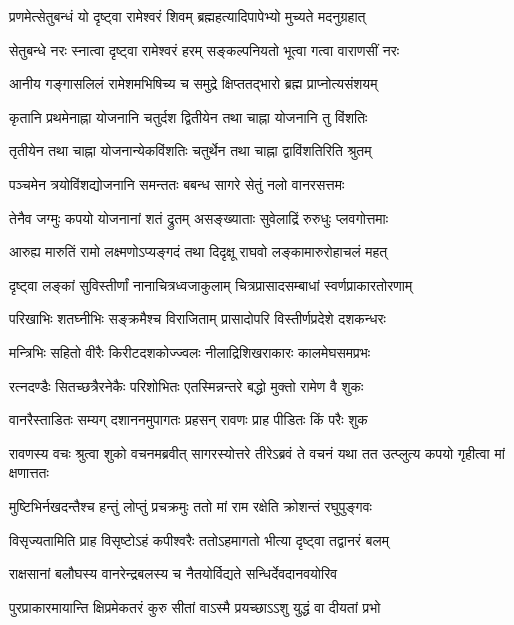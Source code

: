 \twolineshloka
{प्रणमेत्सेतुबन्धं यो दृष्ट्वा रामेश्वरं शिवम्}
{ब्रह्महत्यादिपापेभ्यो मुच्यते मदनुग्रहात्} %

\twolineshloka
{सेतुबन्धे नरः स्नात्वा दृष्ट्वा रामेश्वरं हरम्}
{सङ्कल्पनियतो भूत्वा गत्वा वाराणसीं नरः} %

\twolineshloka
{आनीय गङ्गासलिलं रामेशमभिषिच्य च}
{समुद्रे क्षिप्ततद्भारो ब्रह्म प्राप्नोत्यसंशयम्} %

\twolineshloka
{कृतानि प्रथमेनाह्ना योजनानि चतुर्दश}
{द्वितीयेन तथा चाह्ना योजनानि तु विंशतिः} %

\twolineshloka
{तृतीयेन तथा चाह्ना योजनान्येकविंशतिः}
{चतुर्थेन तथा चाह्ना द्वाविंशतिरिति श्रुतम्} %

\twolineshloka
{पञ्चमेन त्रयोविंशद्योजनानि समन्ततः}
{बबन्ध सागरे सेतुं नलो वानरसत्तमः} %

\twolineshloka
{तेनैव जग्मुः कपयो योजनानां शतं द्रुतम्}
{असङ्ख्याताः सुवेलाद्रिं रुरुधुः प्लवगोत्तमाः} %

\twolineshloka
{आरुह्य मारुतिं रामो लक्ष्मणोऽप्यङ्गदं तथा}
{दिदृक्षू राघवो लङ्कामारुरोहाचलं महत्} %

\twolineshloka
{दृष्ट्वा लङ्कां सुविस्तीर्णां नानाचित्रध्वजाकुलाम्}
{चित्रप्रासादसम्बाधां स्वर्णप्राकारतोरणाम्} %

\twolineshloka
{परिखाभिः शतघ्नीभिः सङ्क्रमैश्च विराजिताम्}
{प्रासादोपरि विस्तीर्णप्रदेशे दशकन्धरः} %

\twolineshloka
{मन्त्रिभिः सहितो वीरैः किरीटदशकोज्ज्वलः}
{नीलाद्रिशिखराकारः कालमेघसमप्रभः} %

\twolineshloka
{रत्नदण्डैः सितच्छत्रैरनेकैः परिशोभितः}
{एतस्मिन्नन्तरे बद्धो मुक्तो रामेण वै शुकः} %

\twolineshloka
{वानरैस्ताडितः सम्यग् दशाननमुपागतः}
{प्रहसन् रावणः प्राह पीडितः किं परैः शुक} %

\threelineshloka
{रावणस्य वचः श्रुत्वा शुको वचनमब्रवीत्}
{सागरस्योत्तरे तीरेऽब्रवं ते वचनं यथा}
{तत उत्प्लुत्य कपयो गृहीत्वा मां क्षणात्ततः} %

\twolineshloka
{मुष्टिभिर्नखदन्तैश्च हन्तुं लोप्तुं प्रचक्रमुः}
{ततो मां राम रक्षेति क्रोशन्तं रघुपुङ्गवः} %

\twolineshloka
{विसृज्यतामिति प्राह विसृष्टोऽहं कपीश्वरैः}
{ततोऽहमागतो भीत्या दृष्ट्वा तद्वानरं बलम्} %

\twolineshloka
{राक्षसानां बलौघस्य वानरेन्द्रबलस्य च}
{नैतयोर्विद्यते सन्धिर्देवदानवयोरिव} %

\twolineshloka
{पुरप्राकारमायान्ति क्षिप्रमेकतरं कुरु}
{सीतां वाऽस्मै प्रयच्छाऽऽशु युद्धं वा दीयतां प्रभो} %

